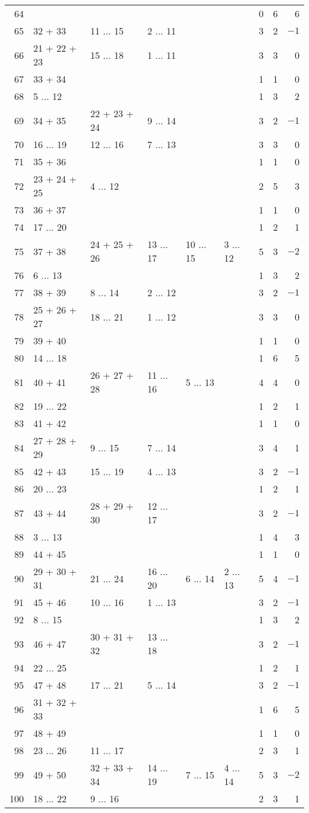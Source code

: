 \documentclass[12pt]{article}
\begin{document}
\begin{tabular}{|r|l|l|l|l|l|r|r|r|}
64 & & & & & & 0 & 6 & 6 \\
65 & 32 + 33 & 11 ... 15 & 2 ... 11 & & & 3 & 2 & $-1$ \\
66 & 21 + 22 + 23 & 15 ... 18 & 1 ... 11 & & & 3 & 3 & 0 \\
67 & 33 + 34 & & & & & 1 & 1 & 0 \\
68 & 5 ... 12 & & & & & 1 & 3 & 2 \\
69 & 34 + 35 & 22 + 23 + 24 & 9 ... 14 & & & 3 & 2 & $-1$ \\
70 & 16 ... 19 & 12 ... 16 & 7 ... 13 & & & 3 & 3 & 0 \\
71 & 35 + 36 & & & & & 1 & 1 & 0 \\
72 & 23 + 24 + 25 & 4 ... 12 & & & & 2 & 5 & 3 \\
73 & 36 + 37 & & & & & 1 & 1 & 0 \\
74 & 17 ... 20 & & & & & 1 & 2 & 1 \\
75 & 37 + 38 & 24 + 25 + 26 & 13 ... 17 & 10 ... 15 & 3 ... 12 & 5 & 3 & $-2$ \\
76 & 6 ... 13 & & & & & 1 & 3 & 2 \\
77 & 38 + 39 & 8 ... 14 & 2 ... 12 & & & 3 & 2 & $-1$ \\
78 & 25 + 26 + 27 & 18 ... 21 & 1 ... 12 & & & 3 & 3 & 0 \\
79 & 39 + 40 & & & & & 1 & 1 & 0 \\
80 & 14 ... 18 & & & & & 1 & 6 & 5 \\
81 & 40 + 41 & 26 + 27 + 28 & 11 ... 16 & 5 ... 13 & & 4 & 4 & 0 \\
82 & 19 ... 22 & & & & & 1 & 2 & 1 \\
83 & 41 + 42 & & & & & 1 & 1 & 0 \\
84 & 27 + 28 + 29 & 9 ... 15 & 7 ... 14 & & & 3 & 4 & 1 \\
85 & 42 + 43 & 15 ... 19 & 4 ... 13 & & & 3 & 2 & $-1$ \\
86 & 20 ... 23 & & & & & 1 & 2 & 1 \\
87 & 43 + 44 & 28 + 29 + 30 & 12 ... 17 & & & 3 & 2 & $-1$ \\
88 & 3 ... 13 & & & & & 1 & 4 & 3 \\
89 & 44 + 45 & & & & & 1 & 1 & 0 \\
90 & 29 + 30 + 31 & 21 ... 24 & 16 ... 20 & 6 ... 14 & 2 ... 13 & 5 & 4 & $-1$ \\
91 & 45 + 46 & 10 ... 16 & 1 ... 13 & & & 3 & 2 & $-1$ \\
92 & 8 ... 15 & & & & & 1 & 3 & 2 \\
93 & 46 + 47 & 30 + 31 + 32 & 13 ... 18 & & & 3 & 2 & $-1$ \\
94 & 22 ... 25 & & & & & 1 & 2 & 1 \\
95 & 47 + 48 & 17 ... 21 & 5 ... 14 & & & 3 & 2 & $-1$ \\
96 & 31 + 32 + 33 & & & & & 1 & 6 & 5 \\
97 & 48 + 49 & & & & & 1 & 1 & 0 \\
98 & 23 ... 26 & 11 ... 17 & & & & 2 & 3 & 1 \\
99 & 49 + 50 & 32 + 33 + 34 & 14 ... 19 & 7 ... 15 & 4 ... 14 & 5 & 3 & $-2$ \\
100 & 18 ... 22 & 9 ... 16 & & & & 2 & 3 & 1 \\
\end{tabular}
\end{document}

